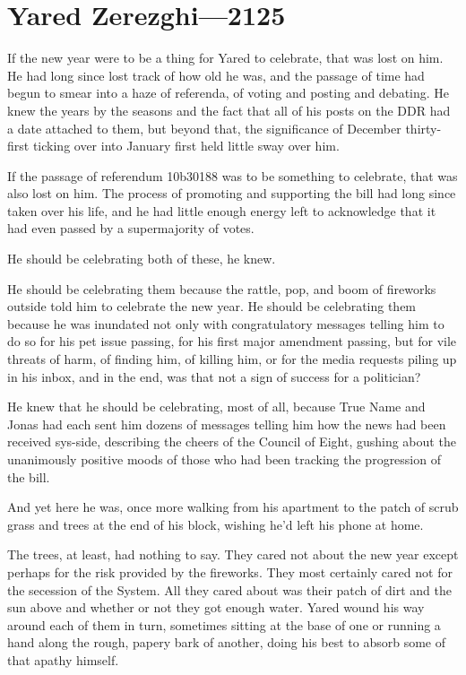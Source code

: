 \hypertarget{yared-zerezghi-2125}{%
\chapter{Yared Zerezghi—2125}\label{yared-zerezghi-2125}}

If the new year were to be a thing for Yared to celebrate, that was lost on him. He had long since lost track of how old he was, and the passage of time had begun to smear into a haze of referenda, of voting and posting and debating. He knew the years by the seasons and the fact that all of his posts on the DDR had a date attached to them, but beyond that, the significance of December thirty-first ticking over into January first held little sway over him.

If the passage of referendum 10b30188 was to be something to celebrate, that was also lost on him. The process of promoting and supporting the bill had long since taken over his life, and he had little enough energy left to acknowledge that it had even passed by a supermajority of votes.

He should be celebrating both of these, he knew.

He should be celebrating them because the rattle, pop, and boom of fireworks outside told him to celebrate the new year. He should be celebrating them because he was inundated not only with congratulatory messages telling him to do so for his pet issue passing, for his first major amendment passing, but for vile threats of harm, of finding him, of killing him, or for the media requests piling up in his inbox, and in the end, was that not a sign of success for a politician?

He knew that he should be celebrating, most of all, because True Name and Jonas had each sent him dozens of messages telling him how the news had been received sys-side, describing the cheers of the Council of Eight, gushing about the unanimously positive moods of those who had been tracking the progression of the bill.

And yet here he was, once more walking from his apartment to the patch of scrub grass and trees at the end of his block, wishing he'd left his phone at home.

The trees, at least, had nothing to say. They cared not about the new year except perhaps for the risk provided by the fireworks. They most certainly cared not for the secession of the System. All they cared about was their patch of dirt and the sun above and whether or not they got enough water. Yared wound his way around each of them in turn, sometimes sitting at the base of one or running a hand along the rough, papery bark of another, doing his best to absorb some of that apathy himself.

